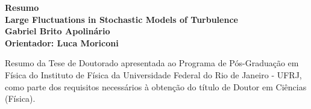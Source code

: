 \documentclass[brazil,12pt,a4paper,openany]{book}
\begin{document}




\newpage

\thispagestyle{empty}

\noindent


\clearpage


%
%





\newpage

\noindent

\vspace*{20pt}
\begin{center}
{\LARGE\bf Resumo}\\
\vspace{15pt}
{\Large\bf Large Fluctuations in Stochastic Models of Turbulence}\\
\vspace{6pt}
{\bf Gabriel Brito Apolinário}\\
\vspace{12pt}
{\bf Orientador: Luca Moriconi}\\
\vspace{20pt}
\parbox{14cm}{Resumo da Tese de Doutorado apresentada ao Programa de Pós-Graduação em Física do Instituto de Física da Universidade Federal do Rio de Janeiro - UFRJ, como parte dos requisitos necessários à obtenção do título de Doutor em Ciências (Física).}
\end{center}
\vspace*{35pt}
\end{document}
